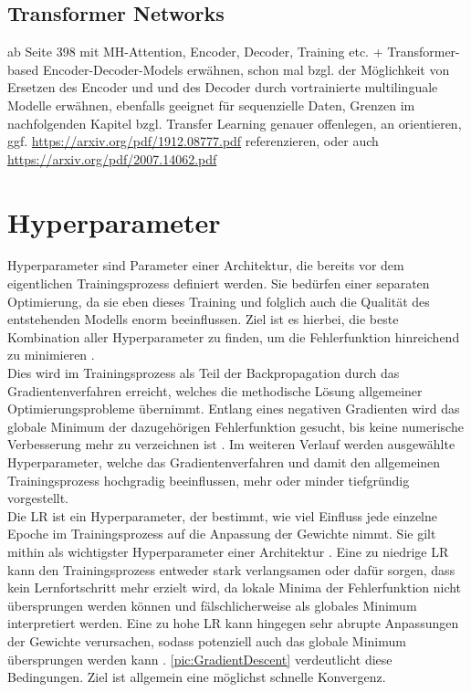 \subsection{Transformer Networks}
\noindent
\cite{ZHA20} ab Seite 398 mit MH-Attention, Encoder, Decoder, Training etc. + Transformer-based Encoder-Decoder-Models erwähnen, schon mal \cite{ROT20} bzgl. der Möglichkeit von Ersetzen des Encoder und und des Decoder durch vortrainierte multilinguale Modelle erwähnen, ebenfalls geeignet für sequenzielle Daten, Grenzen im nachfolgenden Kapitel bzgl. Transfer Learning genauer offenlegen, an \cite{RAF20} orientieren, ggf. \url{https://arxiv.org/pdf/1912.08777.pdf} referenzieren, oder auch \url{https://arxiv.org/pdf/2007.14062.pdf}


\section{Hyperparameter}
\noindent
Hyperparameter sind Parameter einer Architektur, die bereits vor dem eigentlichen Trainingsprozess definiert werden. Sie bedürfen einer separaten Optimierung, da sie eben dieses Training und folglich auch die Qualität des entstehenden Modells enorm beeinflussen. Ziel ist es hierbei, die beste Kombination aller Hyperparameter zu finden, um die Fehlerfunktion hinreichend zu minimieren \cite[S.~1]{YAN20}.\\

\noindent
Dies wird im Trainingsprozess als Teil der Backpropagation durch das Gradientenverfahren erreicht, welches die methodische Lösung allgemeiner Optimierungsprobleme übernimmt. Entlang eines negativen Gradienten wird das globale Minimum der dazugehörigen Fehlerfunktion gesucht, bis keine numerische Verbesserung mehr zu verzeichnen ist \cite[S.~428]{ZHA20}. Im weiteren Verlauf werden ausgewählte Hyperparameter, welche das Gradientenverfahren und damit den allgemeinen Trainingsprozess hochgradig beeinflussen, mehr oder minder tiefgründig vorgestellt.\\

\noindent
Die \ac{LR} ist ein Hyperparameter, der bestimmt, wie viel Einfluss jede einzelne Epoche im Trainingsprozess auf die Anpassung der Gewichte nimmt. Sie gilt mithin als wichtigster Hyperparameter einer Architektur \cite[S.~428]{ZHA20}. Eine zu niedrige \ac{LR} kann den Trainingsprozess entweder stark verlangsamen oder dafür sorgen, dass kein Lernfortschritt mehr erzielt wird, da lokale Minima der Fehlerfunktion nicht übersprungen werden können und fälschlicherweise als globales Minimum interpretiert werden. Eine zu hohe \ac{LR} kann hingegen sehr abrupte Anpassungen der Gewichte verursachen, sodass potenziell auch das globale Minimum übersprungen werden kann \cite[S.~414-415]{ZHA20}. \autoref{pic:GradientDescent} verdeutlicht diese Bedingungen. Ziel ist allgemein eine möglichst schnelle Konvergenz.\\


